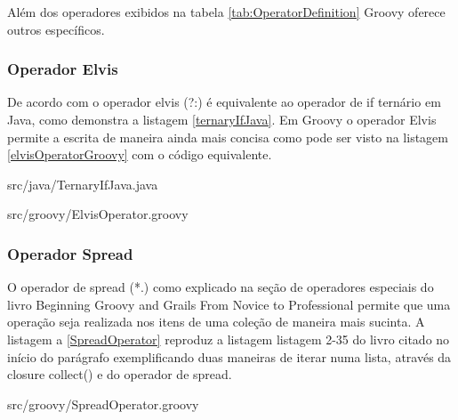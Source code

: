 \documentclass[12pt]{article}
\begin{document}
    Além dos operadores exibidos na tabela \ref{tab:OperatorDefinition} Groovy 
    oferece outros específicos.

\subsubsection{Operador Elvis}

    De acordo com \cite{beginingGroovy:2008} o operador elvis (?:) é equivalente
    ao operador de if ternário em Java, como demonstra a listagem \ref{ternaryIfJava}.
    Em Groovy o operador Elvis permite a escrita de maneira ainda mais concisa 
    como pode ser visto na listagem \ref{elvisOperatorGroovy} com o código equivalente.
    
    
                    {src/java/TernaryIfJava.java}
    
    
                    {src/groovy/ElvisOperator.groovy}
                    
\subsubsection{Operador Spread}

    O operador de spread (*.) como explicado na seção de operadores especiais do
    livro Beginning Groovy and Grails From Novice to Professional\cite{beginingGroovy:2008} 
    permite que uma operação seja realizada nos itens de uma coleção de maneira 
    mais sucinta. A listagem a \ref{SpreadOperator} reproduz a listagem listagem
    2-35 do livro citado no início do parágrafo exemplificando duas maneiras de 
    iterar numa lista, através da closure collect() e do operador de spread.
    
    
                    {src/groovy/SpreadOperator.groovy}

%
\end{document}
